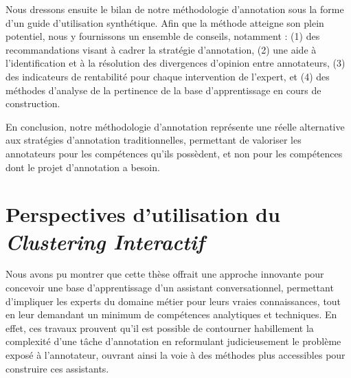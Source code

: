 		Nous dressons ensuite le bilan de notre méthodologie d'annotation sous la forme d'un guide d'utilisation synthétique.
		Afin que la méthode atteigne son plein potentiel, nous y fournissons un ensemble de conseils, notamment : (1) des recommandations visant à cadrer la stratégie d'annotation, (2) une aide à l'identification et à la résolution des divergences d'opinion entre annotateurs, (3) des indicateurs de rentabilité pour chaque intervention de l'expert, et (4) des méthodes d'analyse de la pertinence de la base d'apprentissage en cours de construction.
		
		En conclusion, notre méthodologie d'annotation représente une réelle alternative aux stratégies d'annotation traditionnelles, permettant de valoriser les annotateurs pour les compétences qu'ils possèdent, et non pour les compétences dont le projet d'annotation a besoin.
		
		
	\section*{Perspectives d'utilisation du \textit{Clustering Interactif}}
		
		Nous avons pu montrer que cette thèse offrait une approche innovante pour concevoir une base d'apprentissage d'un assistant conversationnel, permettant d'impliquer les experts du domaine métier pour leurs vraies connaissances, tout en leur demandant un minimum de compétences analytiques et techniques.
		En effet, ces travaux prouvent qu'il est possible de contourner habillement la complexité d'une tâche d'annotation en reformulant judicieusement le problème exposé à l'annotateur, ouvrant ainsi la voie à des méthodes plus accessibles pour construire ces assistants.

